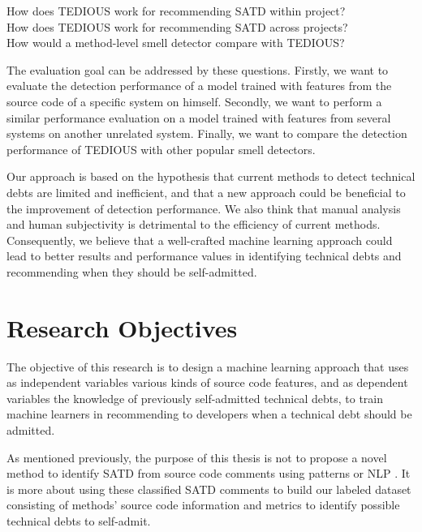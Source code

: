 \begin{center}
\begin{framed}
	 \noindent How does \ac{TEDIOUS} work for recommending \ac{SATD} within project? \\
	 How does \ac{TEDIOUS} work for recommending SATD across projects? \\
	 How would a method-level smell detector compare with \ac{TEDIOUS}?
\end{framed}
\end{center}
	
The evaluation goal can be addressed by these questions. Firstly, we want to evaluate the detection performance of a model trained with features from the source code of a specific system on himself. Secondly, we want to perform a similar performance evaluation on a model trained with features from several systems on another unrelated system. Finally, we want to compare the detection performance of TEDIOUS with other popular smell detectors.

Our approach is based on the hypothesis that current methods to detect technical debts are limited and inefficient, and that a new approach could be beneficial to the improvement of detection performance. We also think that manual analysis and human subjectivity is detrimental to the efficiency of current methods. Consequently, we believe that a well-crafted machine learning approach could lead to better results and performance values in identifying technical debts and recommending when they should be self-admitted. \par

\section{Research Objectives}  


\begin{center}
\begin{framed}
	\noindent The objective of this research is to design a machine learning approach that uses as independent variables various kinds of source code features, and as dependent variables the knowledge of previously self-admitted technical debts, to train machine learners in recommending to developers when a technical debt should be admitted.
\end{framed}
\end{center}

As mentioned previously, the purpose of this thesis is not to propose a novel method to identify SATD from source code comments using patterns or \ac{NLP} \citep{MaldonadoNLP,PotdarS14}. It is more about using these classified SATD comments to build our labeled dataset consisting of methods' source code information and metrics to identify possible technical debts to self-admit. \par
 
